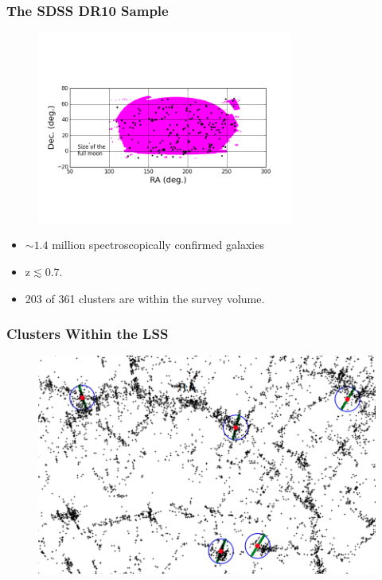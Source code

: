 \documentclass[hyperref={pdfpagelabels=false}]{beamer}
\begin{document}
\begin{frame}
  \frametitle{The SDSS DR10 Sample}
  \begin{figure}
    \includegraphics[width=0.75\textwidth]{sdss_data_trim.png}
  \end{figure}  
  
  \begin{itemize}
  \item $\sim 1.4$ million spectroscopically confirmed galaxies
  \item $\mathrm{z \lesssim0.7}$.
  \item 203 of 361 clusters are within the survey volume.
  \end{itemize}

\end{frame}

\begin{frame}
\frametitle{Clusters Within the LSS}
    \begin{figure}
      \includegraphics[width=\textwidth]{sample_slice.png}
    \end{figure}
\end{frame}
\end{document}
